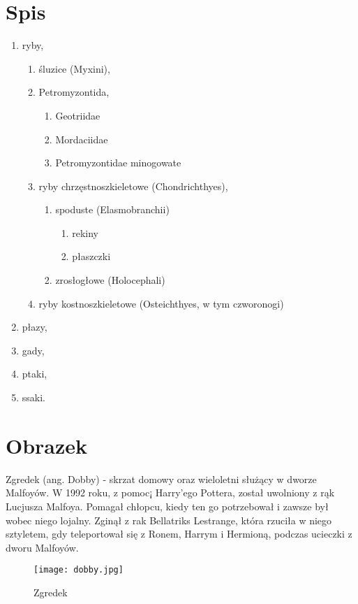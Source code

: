 \documentclass[a4paper,11pt]{amsart}
\begin{document}
\section{Spis}
\begin{enumerate}[label=\Alph*)]
\item ryby,
\begin{enumerate}[label=A.b.\alph*)]
\item śluzice (Myxini),
\item Petromyzontida,
\begin{enumerate}[label=A.b.\Roman*)]
\item Geotriidae
\item Mordaciidae
\item Petromyzontidae minogowate
\end{enumerate}
\item ryby chrzęstnoszkieletowe (Chondrichthyes),
\begin{enumerate}[label=A.b.\Roman*)]
\item spoduste (Elasmobranchii)
\begin{enumerate}[label=|\roman*|]
\item rekiny
\item płaszczki
\end{enumerate}
\item zrosłogłowe (Holocephali)
\end{enumerate}
\item ryby kostnoszkieletowe (Osteichthyes, w tym czworonogi)
\end{enumerate}
\item płazy,
\item gady,
\item ptaki,
\item ssaki.
\end{enumerate}
\newpage
\section{Obrazek}
Zgredek (ang. Dobby) - skrzat domowy oraz wieloletni służący w
dworze Malfoyów. W 1992 roku, z pomoc¡ Harry'ego Pottera, został
uwolniony z rąk Lucjusza Malfoya. Pomagał chłopcu, kiedy ten go
potrzebował i zawsze był wobec niego lojalny. Zginął z rak Bellatriks
Lestrange, która rzuciła w niego sztyletem, gdy teleportował się z Ronem, Harrym i Hermioną, podczas ucieczki z dworu Malfoyów.
\begin{figure}[htbp]
\texttt{[image: dobby.jpg]}
\caption{Zgredek}
\end{figure}
\end{document}
